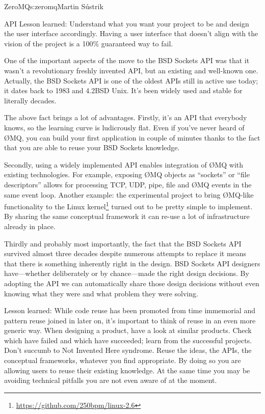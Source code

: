 \begin{aosachapter}{ZeroMQ}{s:zeromq}{Martin S\'{u}strik}
\begin{aosasect1}{API}
Lesson learned: Understand what you want your project to be and design
the user interface accordingly. Having a user interface that doesn't align with
the vision of the project is a 100\% guaranteed way to fail.

One of the important aspects of the move to the BSD Sockets API was that it
wasn't a revolutionary freshly invented API, but an existing and
well-known one. Actually, the BSD Sockets API is one of the oldest APIs
still in active use today; it dates back to 1983 and 4.2BSD Unix. It's been
widely used and stable for literally decades.

The above fact brings a lot of advantages.  Firstly, it's an API that
everybody knows, so the learning curve is ludicrously flat. Even if
you've never heard of {\O}MQ, you can build your first application
in couple of minutes thanks to the fact that you are able to reuse
your BSD Sockets knowledge.

Secondly, using a widely implemented API enables integration of {\O}MQ
with existing technologies. For example, exposing {\O}MQ objects as
``sockets'' or ``file descriptors'' allows for processing TCP, UDP,
pipe, file and {\O}MQ events in the same event loop. Another example: the
experimental project to bring {\O}MQ-like functionality to the Linux
kernel\footnote{\url{https://github.com/250bpm/linux-2.6}} turned out
to be pretty simple to implement. By sharing the same conceptual
framework it can re-use a lot of infrastructure already in place.

Thirdly and probably most importantly, the fact that the BSD Sockets
API survived almost three decades despite numerous attempts to
replace it means that there is something inherently right in the
design. BSD Sockets API designers have---whether deliberately or by
chance---made the right design decisions. By adopting the API we can
automatically share those design decisions without even knowing what
they were and what problem they were solving.

Lesson learned: While code reuse has been promoted from time
immemorial and pattern
reuse
joined in later on, it's important to think of reuse in an
even more generic way. When designing a product, have a look at similar
products. Check which have failed and which have succeeded; learn from
the successful projects. Don't succumb to Not Invented Here
syndrome. Reuse
the ideas, the APIs, the conceptual frameworks, whatever you find
appropriate. By doing so you are allowing users to reuse their
existing knowledge. At the same time you may be avoiding technical
pitfalls you are not even aware of at the moment.


\end{aosasect1}
\end{aosachapter}
